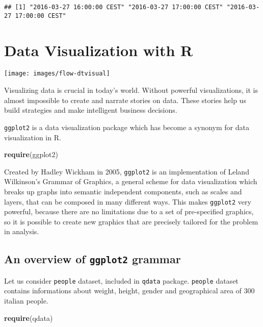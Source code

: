 \documentclass[]{book}
\newenvironment{Shaded}{\begin{snugshade}}{\end{snugshade}}
\newcommand{\KeywordTok}[1]{\textcolor[rgb]{0.13,0.29,0.53}{\textbf{{#1}}}}
\newcommand{\NormalTok}[1]{{#1}}
\begin{document}
\begin{verbatim}
## [1] "2016-03-27 16:00:00 CEST" "2016-03-27 17:00:00 CEST" "2016-03-27 17:00:00 CEST"
\end{verbatim}

\chapter{Data Visualization with R}\label{data-visualization-with-r}

\texttt{[image: images/flow-dtvisual]}

Visualizing data is crucial in today's world. Without powerful
visualizations, it is almost impossible to create and narrate stories on
data. These stories help us build strategies and make intelligent
business decisions.

\texttt{ggplot2} is a data visualization package which has become a
synonym for data visualization in R.

\begin{Shaded}
\begin{Highlighting}[]
\KeywordTok{require}\NormalTok{(ggplot2)}
\end{Highlighting}
\end{Shaded}

Created by Hadley Wickham in 2005, \texttt{ggplot2} is an implementation
of Leland Wilkinson's Grammar of Graphics, a general scheme for data
visualization which breaks up graphs into semantic independent
components, such as scales and layers, that can be composed in many
different ways. This makes \texttt{ggplot2} very powerful, because there
are no limitations due to a set of pre-specified graphics, so it is
possible to create new graphics that are precisely tailored for the
problem in analysis.

\section{\texorpdfstring{An overview of \texttt{ggplot2}
grammar}{An overview of ggplot2 grammar}}\label{an-overview-of-ggplot2-grammar}

Let us consider \texttt{people} dataset, included in \texttt{qdata}
package. \texttt{people} dataset contains informations about weight,
height, gender and geographical area of 300 italian people.

\begin{Shaded}
\begin{Highlighting}[]
\KeywordTok{require}\NormalTok{(qdata)}
\end{Highlighting}
\end{Shaded}
\end{document}
